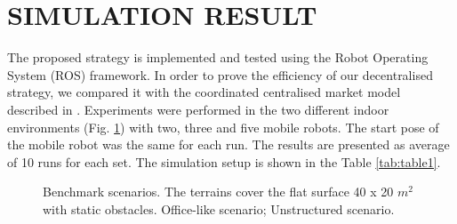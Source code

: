 \section{SIMULATION RESULT}

The proposed strategy is implemented and tested using the Robot Operating System (ROS) framework. In order to prove the efficiency of our decentralised strategy, we compared it with the coordinated centralised market model described in \cite{Burgard2005}. Experiments were performed in the two different indoor environments (Fig. \ref{fig:scenarios}) with two, three and five mobile robots. The start pose of the mobile robot was the same for each run. The results are presented as average of 10 runs for each set. The simulation setup is shown in the Table \ref{tab:table1}.


\begin{figure}[t]
    \setcounter{subfigure}{0}
     \begin{center}
        \hfill
    \end{center}
    \caption{%
       Benchmark scenarios. The terrains cover the flat surface 40 x 20 $m^{2}$ with static obstacles.  Office-like scenario;  Unstructured scenario.
     }%
   \label{fig:scenarios}
\end{figure}




